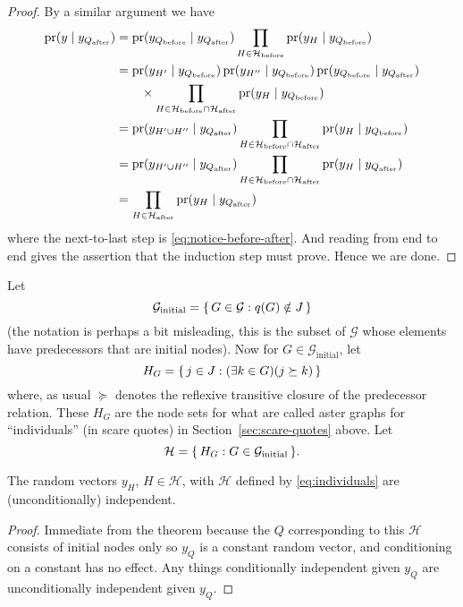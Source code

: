 \begin{proof}
By a similar argument we have
\begin{align*}
   \operatorname{pr}(y \mid  y_{Q_\text{after}})
   & =
   \operatorname{pr}(y_{Q_\text{before}} \mid y_{Q_\text{after}})
   \prod_{H \in \mathcal{H}_\text{before}}
   \operatorname{pr}(y_H \mid y_{Q_\text{before}})
   \\
   & =
   \operatorname{pr}(y_{H'} \mid y_{Q_\text{before}})
   \operatorname{pr}(y_{H''} \mid y_{Q_\text{before}})
   \operatorname{pr}(y_{Q_\text{before}} \mid y_{Q_\text{after}})
   \\
   & \qquad
   \times
   \prod_{H \in \mathcal{H}_\text{before} \cap \mathcal{H}_\text{after}}
   \operatorname{pr}(y_H \mid y_{Q_\text{before}})
   \\
   & =
   \operatorname{pr}(y_{H' \cup H''} \mid  y_{Q_\text{after}})
   \prod_{H \in \mathcal{H}_\text{before} \cap \mathcal{H}_\text{after}}
   \operatorname{pr}(y_H \mid y_{Q_\text{before}})
   \\
   & =
   \operatorname{pr}(y_{H' \cup H''} \mid  y_{Q_\text{after}})
   \prod_{H \in \mathcal{H}_\text{before} \cap \mathcal{H}_\text{after}}
   \operatorname{pr}(y_H \mid y_{Q_\text{after}})
   \\
   & =
   \prod_{H \in \mathcal{H}_\text{after}}
   \operatorname{pr}(y_H \mid y_{Q_\text{after}})
\end{align*}
where the next-to-last step is \eqref{eq:notice-before-after}.
And reading from end to end gives the assertion that the induction step
must prove.  Hence we are done.
\end{proof}

Let
$$
   \mathcal{G}_\text{initial}
   =
   \{\,  G \in \mathcal{G} : q(G) \notin J  \,\}
$$
(the notation is perhaps a bit misleading, this is the subset of $\mathcal{G}$
whose elements have predecessors that are initial nodes).
Now for $G \in \mathcal{G}_\text{initial}$, let
$$
   H_G = \{\,  j \in J : (\exists k \in G)(j \succeq k)  \,\}
$$
where, as usual $\succeq$ denotes the reflexive transitive closure of the
predecessor relation.  These $H_G$ are the node sets for what are called
aster graphs for ``individuals'' (in scare quotes)
in Section~\ref{sec:scare-quotes} above.
Let
\begin{equation} \label{eq:individuals}
   \mathcal{H} = \{\,  H_G : G \in \mathcal{G}_\text{initial}  \,\}.
\end{equation}

\begin{corollary} \label{cor:markov}
The random vectors $y_H$, $H \in \mathcal{H}$, with $\mathcal{H}$
defined by \eqref{eq:individuals} are (unconditionally) independent.
\end{corollary}
\begin{proof}
Immediate from the theorem because the $Q$ corresponding to this $\mathcal{H}$
consists of initial nodes only so $y_Q$ is a constant random vector, and
conditioning on a constant has no effect.  Any things conditionally independent
given $y_Q$ are unconditionally independent given $y_Q$.
\end{proof}


